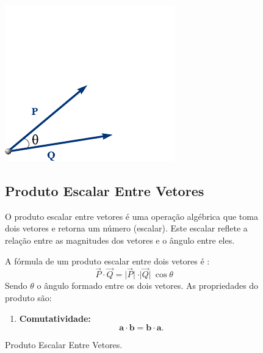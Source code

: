 \documentclass[a4paper, 14pt, twoside]{article}
\begin{document}
\begin{figure}[h]
    \begin{minipage}[t]{0.35\textwidth}
        \vspace{2cm} %
        \centering
        \includegraphics[width=0.8\linewidth]{Figuras/prodvetesc.pdf}
        \caption{Produto Escalar Entre Vetores.}
        \label{fig:prodvetesvr}
    \end{minipage}%
    \hfill
    \begin{minipage}[t]{0.60\textwidth}
        \vspace{4cm} %
        \subsection{Produto Escalar Entre Vetores} %
        \begin{tcolorbox}[colframe=lockheed, colback=white, title=Produto Escalar Entre Vetores, fonttitle=\bfseries]
            O produto escalar entre vetores é uma operação algébrica que toma dois vetores e retorna um número (\textcolor{lockheed}{escalar}). Este escalar reflete a relação entre as magnitudes dos vetores e o ângulo entre eles.
        \end{tcolorbox}
        A fórmula de um produto escalar entre dois vetores é :
        \[\vec{P} \cdot \vec{Q} = \vert\vec{P}\vert\ \cdot \vert\vec{Q}\vert \ \cos \theta \]
        Sendo $\theta$ o ângulo formado entre os dois vetores. As propriedades do produto são: 
        \begin{enumerate}
            \item \textbf{Comutatividade:}
            \[
            \mathbf{a} \cdot \mathbf{b} = \mathbf{b} \cdot \mathbf{a}.
            \]
            

\end{enumerate}
\end{minipage}
\end{figure}
\end{document}
